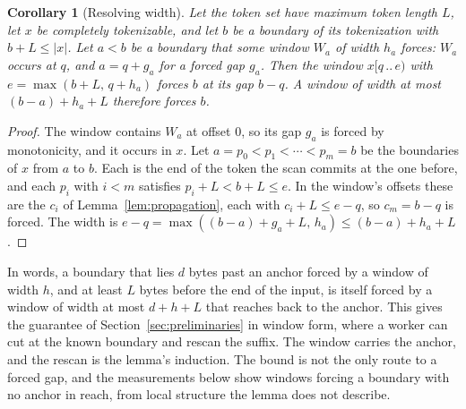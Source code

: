 \documentclass[11pt,a4paper]{article}
\theoremstyle{definition}
\theoremstyle{plain}
\newtheorem{corollary}{Corollary}
\begin{document}
\begin{corollary}[Resolving width]
\label{cor:width}
Let the token set have maximum token length $L$, let $x$ be completely tokenizable, and let $b$ be a boundary of its
tokenization with $b + L \leq |x|$. Let $a < b$ be a boundary that some window $W_a$ of width $h_a$ forces: $W_a$ occurs
at $q$, and $a = q + g_a$ for a forced gap $g_a$. Then the window $x[q \,..\, e)$ with $e = \max(b + L,\, q + h_a)$
forces $b$ at its gap $b - q$. A window of width at most $(b - a) + h_a + L$ therefore forces $b$.
\end{corollary}

\begin{proof}
The window contains $W_a$ at offset $0$, so its gap $g_a$ is forced by monotonicity, and it occurs in $x$. Let
$a = p_0 < p_1 < \cdots < p_m = b$ be the boundaries of $x$ from $a$ to $b$. Each is the end of the token the scan
commits at the one before, and each $p_i$ with $i < m$ satisfies $p_i + L < b + L \leq e$. In the window's offsets these
are the $c_i$ of Lemma~\ref{lem:propagation}, each with $c_i + L \leq e - q$, so $c_m = b - q$ is forced. The width is
$e - q = \max((b - a) + g_a + L,\, h_a) \leq (b - a) + h_a + L$.
\end{proof}

In words, a boundary that lies $d$ bytes past an anchor forced by a window of width $h$, and at least $L$ bytes before
the end of the input, is itself forced by a window of width at most $d + h + L$ that reaches back to the anchor. This
gives the guarantee of Section~\ref{sec:preliminaries} in window form, where a worker can cut at the known boundary and
rescan the suffix. The window carries the anchor, and the rescan is the lemma's induction. The bound is not the only
route to a forced gap, and the measurements below show windows forcing a boundary with no anchor in reach, from local
structure the lemma does not describe.
\end{document}
